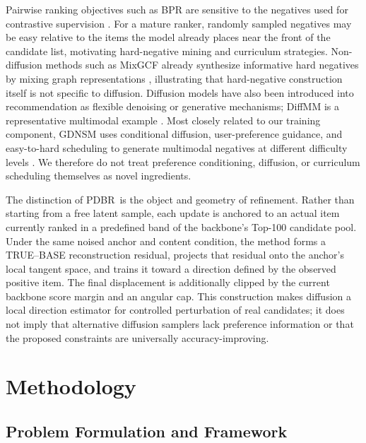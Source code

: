 \documentclass[sigconf,anonymous,review]{acmart}
\newcommand{\pdbr}{PDBR}
\begin{document}
Pairwise ranking objectives such as BPR are sensitive to the negatives used for contrastive supervision \cite{rendle2009bpr}.
For a mature ranker, randomly sampled negatives may be easy relative to the items the model already places near the front of the candidate list, motivating hard-negative mining and curriculum strategies. Non-diffusion methods such as MixGCF already synthesize informative hard negatives by mixing graph representations \cite{huang2021mixgcf}, illustrating that hard-negative construction itself is not specific to diffusion.
Diffusion models have also been introduced into recommendation as flexible denoising or generative mechanisms; DiffMM is a representative multimodal example \cite{jiang2024diffmm}.
Most closely related to our training component, GDNSM uses conditional diffusion, user-preference guidance, and easy-to-hard scheduling to generate multimodal negatives at different difficulty levels \cite{ma2025gdnsm}.
We therefore do not treat preference conditioning, diffusion, or curriculum scheduling themselves as novel ingredients.

The distinction of \pdbr\ is the object and geometry of refinement.
Rather than starting from a free latent sample, each update is anchored to an actual item currently ranked in a predefined band of the backbone's Top-100 candidate pool.
Under the same noised anchor and content condition, the method forms a TRUE--BASE reconstruction residual, projects that residual onto the anchor's local tangent space, and trains it toward a direction defined by the observed positive item.
The final displacement is additionally clipped by the current backbone score margin and an angular cap.
This construction makes diffusion a local direction estimator for controlled perturbation of real candidates; it does not imply that alternative diffusion samplers lack preference information or that the proposed constraints are universally accuracy-improving.

\section{Methodology}
\label{sec:method}

\subsection{Problem Formulation and Framework}
\end{document}
